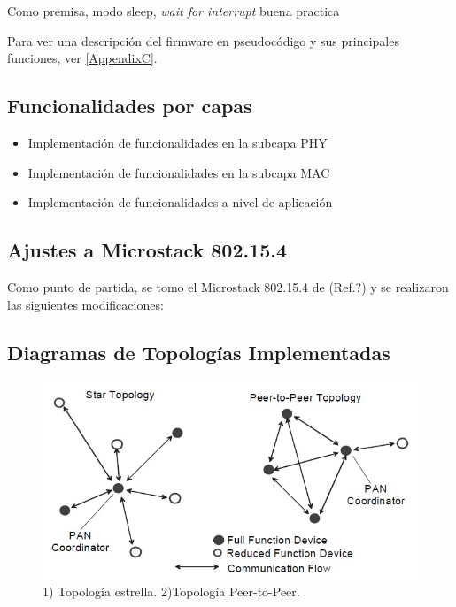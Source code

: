 {Como premisa, modo sleep,
\textit{wait for interrupt} buena practica

Para ver una descripción del firmware en pseudocódigo y sus principales funciones, ver \ref{AppendixC}.

\subsection{Funcionalidades por capas}
\label{subsec:func} 
\begin{itemize}
	\item Implementación de funcionalidades en la subcapa PHY
	
	\item Implementación de funcionalidades en la subcapa MAC

	\item Implementación de funcionalidades a nivel de aplicación
	
\end{itemize}

\subsection{Ajustes a Microstack 802.15.4}
\label{subsec:stack} 
Como punto de partida, se tomo el Microstack 802.15.4 de (Ref.?) y se realizaron las siguientes modificaciones:
\subsection{Diagramas de Topologías Implementadas}
\label{subsec:topo} 

\begin{figure}[h!]
	\centering
    \includegraphics[width=.8\textwidth]{./Figures/topologia.jpg}
    	\caption{1) Topología estrella. 2)Topología Peer-to-Peer.}
	\label{fig:topo}
\end{figure}

}
